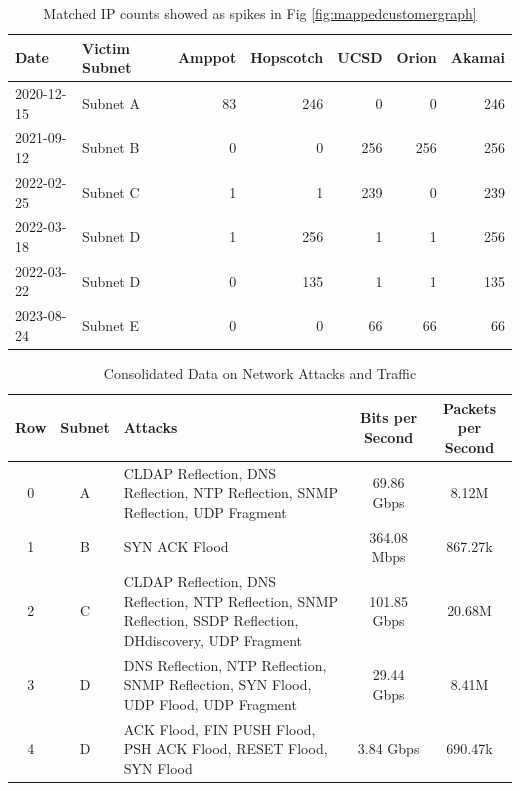 \begin{table}[htbp]
    \centering
    \caption{Matched IP counts showed as spikes in Fig \ref{fig:mappedcustomergraph}}
    \begin{tabular}{|l|l|r|r|r|r|r|}
    \hline
    \textbf{Date} & \textbf{Victim Subnet} & \textbf{Amppot} & \textbf{Hopscotch} & \textbf{UCSD} & \textbf{Orion} & \textbf{Akamai} \\
    \hline
    2020-12-15 & Subnet A & 83 & 246 & 0 & 0 & 246 \\
    2021-09-12 & Subnet B & 0 & 0 & 256 & 256 & 256 \\
    2022-02-25 & Subnet C & 1 & 1 & 239 & 0 & 239 \\
    2022-03-18 & Subnet D & 1 & 256 & 1 & 1 & 256 \\
    2022-03-22 & Subnet D & 0 & 135 & 1 & 1 & 135 \\
    2023-08-24 & Subnet E & 0 & 0 & 66 & 66 & 66 \\
    \hline
    \end{tabular}
    \label{table:spikes_data}
    \end{table}


\begin{table}[ht]
    \centering
    \begin{tabular}{|c|c|p{5cm}|c|c|}
    \hline
    \textbf{Row} & \textbf{Subnet} & \textbf{Attacks} & \textbf{Bits per Second} & \textbf{Packets per Second} \\ \hline
    0 & A & CLDAP Reflection, DNS Reflection, NTP Reflection, SNMP Reflection, UDP Fragment & 69.86 Gbps & 8.12M \\ \hline
    1 & B & SYN ACK Flood & 364.08 Mbps & 867.27k \\ \hline
    2 & C & CLDAP Reflection, DNS Reflection, NTP Reflection, SNMP Reflection, SSDP Reflection, DHdiscovery, UDP Fragment & 101.85 Gbps & 20.68M \\ \hline
    3 & D & DNS Reflection, NTP Reflection, SNMP Reflection, SYN Flood, UDP Flood, UDP Fragment & 29.44 Gbps & 8.41M \\ \hline
    4 & D & ACK Flood, FIN PUSH Flood, PSH ACK Flood, RESET Flood, SYN Flood & 3.84 Gbps & 690.47k \\ \hline
    \end{tabular}
    \caption{Consolidated Data on Network Attacks and Traffic}
    \label{table:network-attacks}
    \end{table}

